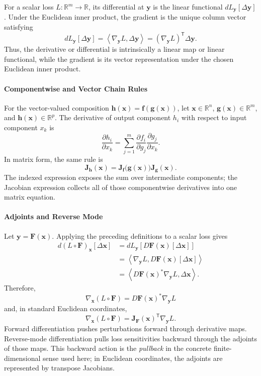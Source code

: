 \documentclass{article}
\begin{document}
For a scalar loss \(L:\mathbb{R}^m\to\mathbb{R}\), its differential at
\(\mathbf{y}\) is the linear functional
\(dL_{\mathbf{y}}[\Delta\mathbf{y}]\). Under the Euclidean inner
product, the gradient is the unique column vector satisfying
\[
  dL_{\mathbf{y}}[\Delta\mathbf{y}]
  =
  \left\langle\nabla_{\mathbf{y}}L,\Delta\mathbf{y}\right\rangle
  =
  (\nabla_{\mathbf{y}}L)^\mathsf{T}\Delta\mathbf{y}.
\]
Thus, the derivative or differential is intrinsically a linear map or
linear functional, while the gradient is its vector representation
under the chosen Euclidean inner product.

\paragraph{Componentwise and Vector Chain Rules}
For the vector-valued composition
\(\mathbf{h}(\mathbf{x})=\mathbf{f}(\mathbf{g}(\mathbf{x}))\), let
\(\mathbf{x}\in\mathbb{R}^n\), \(\mathbf{g}(\mathbf{x})\in\mathbb{R}^m\),
and \(\mathbf{h}(\mathbf{x})\in\mathbb{R}^p\). The derivative of output
component \(h_i\) with respect to input component \(x_k\) is
\[
  \frac{\partial h_i}{\partial x_k}
  =
  \sum_{j=1}^{m}
  \frac{\partial f_i}{\partial g_j}
  \frac{\partial g_j}{\partial x_k}.
\]
In matrix form, the same rule is
\[
  \mathbf{J}_{\mathbf{h}}(\mathbf{x})
  =
  \mathbf{J}_{\mathbf{f}}\bigl(\mathbf{g}(\mathbf{x})\bigr)
  \mathbf{J}_{\mathbf{g}}(\mathbf{x}).
\]
The indexed expression exposes the sum over intermediate components;
the Jacobian expression collects all of those componentwise
derivatives into one matrix equation.

\paragraph{Adjoints and Reverse Mode}
Let \(\mathbf{y}=\mathbf{F}(\mathbf{x})\). Applying the preceding
definitions to a scalar loss gives
\[
  \begin{aligned}
    d(L\circ\mathbf{F})_{\mathbf{x}}[\Delta\mathbf{x}]
    &=
    dL_{\mathbf{y}}
    \left[
      D\mathbf{F}(\mathbf{x})[\Delta\mathbf{x}]
    \right]\\
    &=
    \left\langle
      \nabla_{\mathbf{y}}L,
      D\mathbf{F}(\mathbf{x})[\Delta\mathbf{x}]
    \right\rangle\\
    &=
    \left\langle
      D\mathbf{F}(\mathbf{x})^*\nabla_{\mathbf{y}}L,
      \Delta\mathbf{x}
    \right\rangle.
  \end{aligned}
\]
Therefore,
\[
  \boxed{
    \nabla_{\mathbf{x}}(L\circ\mathbf{F})
    =
    D\mathbf{F}(\mathbf{x})^*
    \nabla_{\mathbf{y}}L
  }
\]
and, in standard Euclidean coordinates,
\[
  \boxed{
    \nabla_{\mathbf{x}}(L\circ\mathbf{F})
    =
    \mathbf{J}_{\mathbf{F}}(\mathbf{x})^\mathsf{T}
    \nabla_{\mathbf{y}}L.
  }
\]
Forward differentiation pushes perturbations forward through derivative
maps. Reverse-mode differentiation pulls loss sensitivities backward
through the adjoints of those maps. This backward action is the
\emph{pullback} in the concrete finite-dimensional sense used here; in
Euclidean coordinates, the adjoints are represented by transpose
Jacobians.
\end{document}
